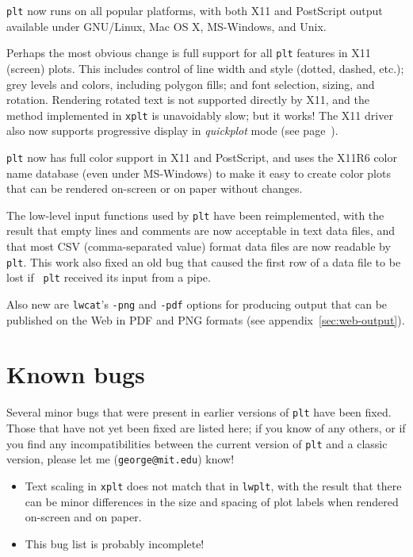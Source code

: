 \documentclass{book}
\begin{document}
{\tt plt} now runs on all popular platforms, with both X11 and PostScript
output available under GNU/Linux, Mac OS X, MS-Windows, and Unix.

%
%
%
%
%
%
%
Perhaps the most obvious change is full support for all {\tt plt} features
in X11 (screen) plots.  This includes control of line width and style (dotted,
dashed, etc.); grey levels and colors, including polygon fills; and font
selection, sizing, and rotation.   Rendering rotated text is not supported
directly by X11, and the method implemented in {\tt xplt} is unavoidably
slow;  but it works!  The X11 driver also now supports progressive
display in {\em quickplot} mode (see page~\pageref{sec:quickplot}).

%
{\tt plt} now has full color support in X11 and PostScript, and uses the X11R6
color name database (even under MS-Windows) to make it easy to create color
plots that can be rendered on-screen or on paper without changes.

%
The low-level input functions used by {\tt plt} have been reimplemented,
with the result that empty lines and comments are now acceptable in
text data files, and that most CSV (comma-separated value) format data
files are now readable by {\tt plt}.  This work also fixed an
old bug that caused the first row of a data file to be lost if {\tt
plt} received its input from a pipe.

%
%
%
Also new are {\tt lwcat}'s {\tt -png} and {\tt -pdf} options for
producing output that can be published on the Web in PDF and PNG
formats (see appendix~\ref{sec:web-output}).

\section{Known bugs}

Several minor bugs that were present in earlier versions of {\tt plt} have
been fixed.  Those that have not yet been fixed are listed here;  if you
know of any others, or if you find any incompatibilities between the current
version of {\tt plt} and a classic version, please let me
({\tt george@mit.edu}) know!

\begin{itemize}

\item
Text scaling in {\tt xplt} does not match that in {\tt lwplt}, with the result
that there can be minor differences in the size and spacing of plot labels when
rendered on-screen and on paper.

\item
This bug list is probably incomplete!
\end{itemize}
\end{document}
